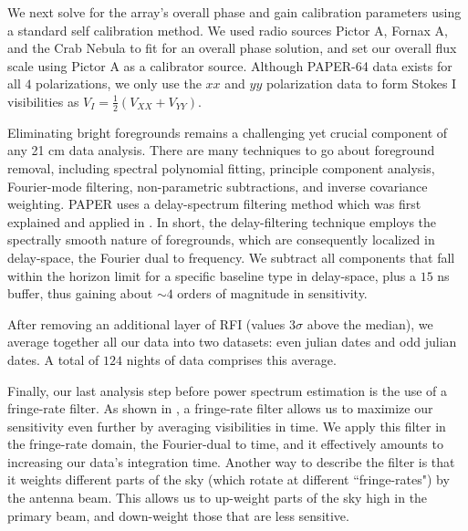 \documentclass[preprint2,numberedappendix,tighten,twocolappendix]{aastex6}  %
\begin{document}
We next solve for the array's overall phase and gain calibration parameters using a standard self calibration method. We used radio sources Pictor A, Fornax A, and the Crab Nebula to fit for an overall phase solution, and set our overall flux scale using Pictor A as a calibrator source. Although PAPER-64 data exists for all $4$ polarizations, we only use the $xx$ and $yy$ polarization data to form Stokes I visibilities as $V_{I} = \frac{1}{2}(V_{XX} + V_{YY})$.

Eliminating bright foregrounds remains a challenging yet crucial component of any 21 cm data analysis. There are many techniques to go about foreground removal, including spectral polynomial fitting, principle component analysis, Fourier-mode filtering, non-parametric subtractions, and inverse covariance weighting. PAPER uses a delay-spectrum filtering method which was first explained and applied in \citet{parsons_et_al2014}. In short, the delay-filtering technique employs the spectrally smooth nature of foregrounds, which are consequently localized in delay-space, the Fourier dual to frequency. We subtract all components that fall within the horizon limit for a specific baseline type in delay-space, plus a $15$ ns buffer, thus gaining about $\sim4$ orders of magnitude in sensitivity. 

After removing an additional layer of RFI (values $3\sigma$ above the median), we average together all our data into two datasets: even julian dates and odd julian dates. A total of $124$ nights of data comprises this average.

Finally, our last analysis step before power spectrum estimation is the use of a fringe-rate filter. As shown in \citet{parsons_et_al2016}, a fringe-rate filter allows us to maximize our sensitivity even further by averaging visibilities in time. We apply this filter in the fringe-rate domain, the Fourier-dual to time, and it effectively amounts to increasing our data's integration time. Another way to describe the filter is that it weights different parts of the sky (which rotate at different ``fringe-rates") by the antenna beam. This allows us to up-weight parts of the sky high in the primary beam, and down-weight those that are less sensitive.
\end{document}
